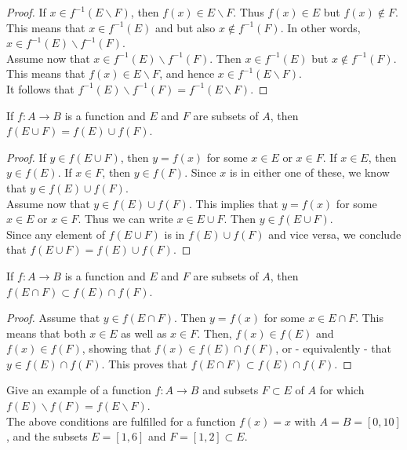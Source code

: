 \documentclass[12pt]{book}
\newenvironment{theorem}[2][Theorem]{\begin{trivlist}
\item[\hskip \labelsep {\bfseries #1}\hskip \labelsep {\bfseries #2.}]}{\end{trivlist}}
\newenvironment{question}[2][Question]{\begin{trivlist}
\item[\hskip \labelsep {\bfseries #1}\hskip \labelsep {\bfseries #2.}]}{\end{trivlist}}
\begin{document}
\begin{proof}
If $x \in f^{-1} (E \backslash F )$, then $f(x) \in E \backslash F$. Thus $f(x) \in E$ but $f(x) \notin F$. This means that $x \in f^{-1}(E)$ and but also $x \notin f^{-1}(F)$. In other words, $x \in f^{-1}(E) \backslash f^{-1} (F)$. \\
Assume now that $x \in f^{-1}(E) \backslash f^{-1} (F)$. Then $x \in f^{-1}(E)$ but $x \notin f^{-1}(F)$. This means that $f(x) \in E \backslash F$, and hence $x \in f^{-1} (E \backslash F)$. \\
It follows that  $f^{-1} (E) \backslash f^{-1} (F ) = f^{-1} (E \backslash F)$.
\end{proof}

\begin{theorem}{1.1.11}
If $f : A \to B$ is a function and $E$ and $F$ are subsets of $A$, then $f (E \cup F ) = f (E) \cup f (F )$.
\end{theorem}

\begin{proof}
If $y \in f(E \cup F)$, then $y = f(x)$ for some $x \in E$ or $x \in F$. If $x \in E$, then $y \in f(E)$. If $x \in F$, then $y \in f(F)$. Since $x$ is in either one of these, we know that $y \in f(E) \cup f(F)$. \\
Assume now that $y \in f(E) \cup f(F)$. This implies that $y=f(x)$ for some $x \in E$ or $x\in F$. Thus we can write $x \in E \cup F$. Then $y \in f(E \cup F)$. \\
Since any element of $f(E \cup F)$ is in $f(E) \cup f(F)$ and vice versa, we conclude that $f (E \cup F ) = f (E) \cup f (F )$.
\end{proof}


\begin{theorem}{1.1.12}
If $f : A \to B$ is a function and $E$ and $F$ are subsets of $A$, then $f (E \cap F ) \subset f (E) \cap f (F )$.
\end{theorem}

\begin{proof}
Assume that $y \in f(E \cap F)$. Then $y = f(x)$ for some $x \in E \cap F$. This means that both $x \in E$ as well as $x \in F$. Then, $f(x) \in f(E)$ and $f(x) \in f(F)$, showing that $f(x) \in f(E) \cap f(F)$, or - equivalently - that $y \in f(E) \cap f(F)$. This proves that $f (E \cap F ) \subset f (E) \cap f (F )$.
\end{proof}

\begin{question}{1.1.13}
Give an example of a function $f : A \to B$ and subsets $F\subset E$ of $A$ for
which $f (E) \backslash f (F ) = f (E \backslash F )$. \\

The above conditions are fulfilled for a function $f(x)=x$ with $A=B=[0,10]$, and the subsets $E=[1,6]$ and $F = [1,2] \subset E$.
\end{question}
\end{document}
